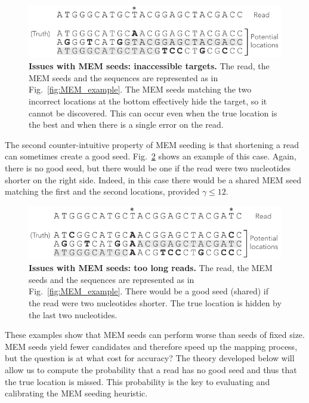 \documentclass{article}
\begin{document}
\begin{figure}[h]
\centering
\includegraphics[scale=1]{full_masking_example.pdf}
\caption{\textbf{Issues with MEM seeds: inaccessible targets.}
The read, the MEM seeds and the sequences are represented as in
Fig.~\ref{fig:MEM_example}. The MEM seeds matching the two incorrect
locations at the bottom effectively hide the target, so it cannot
be discovered. This can occur even when the true location is the
best and when there is a single error on the read.}
\label{fig:full_masking_example}
\end{figure}

The second counter-intuitive property of MEM seeding is that shortening
a read can sometimes create a good seed. Fig.~\ref{fig:short_vs_long}
shows an example of this case. Again, there is no good seed, but there
would be one if the read were two nucleotides shorter on the right side.
Indeed, in this case there would be a shared MEM seed matching the first
and the second locations, provided $\gamma \leq 12$.


\begin{figure}[h]
\centering
\includegraphics[scale=1]{short_vs_long_example.pdf}
\caption{\textbf{Issues with MEM seeds: too long reads.}
The read, the MEM seeds and the sequences are represented as in
Fig.~\ref{fig:MEM_example}. There would be a good seed (shared) if the
read were two nucleotides shorter. The true location is hidden by
the last two nucleotides.}
\label{fig:short_vs_long}
\end{figure}

These examples show that MEM seeds can perform worse than seeds of fixed
size. MEM seeds yield fewer candidates and therefore speed up the mapping
process, but the question is at what cost for accuracy? The theory
developed below will allow us to compute the probability that a read has
no good seed and thus that the true location is missed. This probability
is the key to evaluating and calibrating the MEM seeding heuristic.
\end{document}
